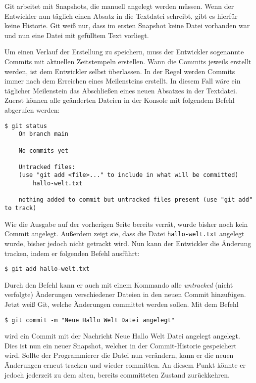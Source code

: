Git arbeitet mit Snapshots, die manuell angelegt werden müssen. Wenn der
Entwickler nun täglich einen Absatz in die Textdatei schreibt, gibt es hierfür
keine Historie. Git weiß nur, dass im ersten Snapshot keine Datei vorhanden war
und nun eine Datei mit gefülltem Text vorliegt.

Um einen Verlauf der Erstellung zu speichern, muss der Entwickler sogenannte
Commits mit aktuellen Zeitstempeln erstellen. Wann die Commits jeweils erstellt
werden, ist dem Entwickler selbst überlassen. In der Regel werden Commits immer
nach dem Erreichen eines Meilensteins erstellt. In diesem Fall wäre ein
täglicher Meilenstein das Abschließen eines neuen Absatzes in der Textdatei.
Zuerst können alle geänderten Dateien in der Konsole mit folgendem Befehl
abgerufen werden:

\begin{lstlisting}[style=Bash]
    $ git status
    On branch main

    No commits yet

    Untracked files:
    (use "git add <file>..." to include in what will be committed)
        hallo-welt.txt

    nothing added to commit but untracked files present (use "git add" to track)
\end{lstlisting}

\newpage

Wie die Ausgabe auf der vorherigen Seite bereits verrät, wurde bisher noch kein
Commit angelegt. Außerdem zeigt sie, dass die Datei \texttt{hallo-welt.txt}
angelegt wurde, bisher jedoch nicht getrackt wird. Nun kann der Entwickler die
Änderung tracken, indem er folgenden Befehl ausführt:

\begin{lstlisting}[style=Bash]
    $ git add hallo-welt.txt
\end{lstlisting}

Durch den Befehl  kann er auch mit einem Kommando alle
\emph{untracked} (nicht verfolgte) Änderungen verschiedener Dateien in den neuen
Commit hinzufügen. Jetzt weiß Git, welche Änderungen committet werden sollen.
Mit dem Befehl

\begin{lstlisting}[style=Bash]
    $ git commit -m "Neue Hallo Welt Datei angelegt"
\end{lstlisting}

wird ein Commit mit der Nachricht \glqq Neue Hallo Welt Datei angelegt\grqq{}
angelegt. Dies ist nun ein neuer Snapshot, welcher in der Commit-Historie
gespeichert wird. Sollte der Programmierer die Datei nun verändern, kann er die
neuen Änderungen erneut tracken und wieder committen. An diesem Punkt könnte er
jedoch jederzeit zu dem alten, bereits committeten Zustand zurückkehren.

